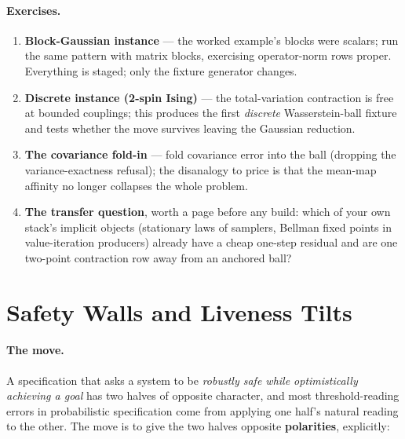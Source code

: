 \paragraph{Exercises.}
\begin{enumerate}
\item \textbf{Block-Gaussian instance} --- the worked example's blocks
  were scalars; run the same pattern with matrix blocks, exercising
  operator-norm rows proper. Everything is staged; only the fixture
  generator changes.
\item \textbf{Discrete instance (2-spin Ising)} --- the
  total-variation contraction is free at bounded couplings; this
  produces the first \emph{discrete} Wasserstein-ball fixture and
  tests whether the move survives leaving the Gaussian reduction.
\item \textbf{The covariance fold-in} --- fold covariance error into
  the ball (dropping the variance-exactness refusal); the disanalogy
  to price is that the mean-map affinity no longer collapses the whole
  problem.
\item \textbf{The transfer question}, worth a page before any build:
  which of your own stack's implicit objects (stationary laws of
  samplers, Bellman fixed points in value-iteration producers) already
  have a cheap one-step residual and are one two-point contraction row
  away from an anchored ball?
\end{enumerate}

\section{Safety Walls and Liveness Tilts}
\label{sec:ckbk-polarity}

\paragraph{The move.} A specification that asks a system to be
\emph{robustly safe while optimistically achieving a goal} has two
halves of opposite character, and most threshold-reading errors in
probabilistic specification come from applying one half's natural
reading to the other. The move is to give the two halves opposite
\textbf{polarities}, explicitly:

